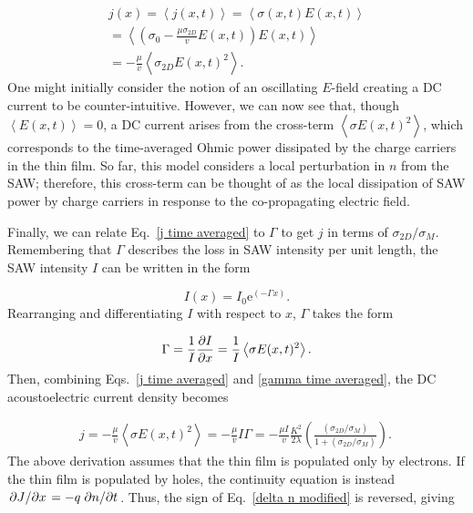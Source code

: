 \documentclass{beavtex_dub_edit}
\begin{document}
\begin{equation}
    \begin{split}
        j(x) = \left\langle j(x,t) \right\rangle = \left\langle \sigma(x,t) E(x,t) \right\rangle \\
        = \left\langle \left( \sigma_0 - \frac{\mu \sigma_{2D}}{v}E(x,t) \right) E(x,t)  \right\rangle \\
        = - \frac{\mu}{v}\left\langle\sigma_{2D} E(x,t)^2\right\rangle. 
    \end{split}
    \label{j time averaged}
\end{equation}
One might initially consider the notion of an oscillating $E$-field creating a DC current to be counter-intuitive. However, we can now see that, though $\left\langle E(x,t) \right\rangle = 0$, a DC current arises from the cross-term $\left\langle \sigma E(x,t) ^2 \right\rangle$, which corresponds to the time-averaged Ohmic power dissipated by the charge carriers in the thin film. So far, this model considers a local perturbation in $n$ from the SAW; therefore, this cross-term can be thought of as the local dissipation of SAW power by charge carriers in response to the co-propagating electric field. 


Finally, we can relate Eq.\ \ref{j time averaged} to $\Gamma$ to get $j$ in terms of $\sigma_{2D}/\sigma_M$. Remembering that $\Gamma$ describes the loss in SAW intensity per unit length, the SAW intensity $I$ can be written in the form

\begin{equation}
    I(x) = I_0 \mathrm{e}^{(-\Gamma x)}.
\end{equation}
Rearranging and differentiating $I$ with respect to $x$, $\Gamma$ takes the form

\begin{equation}
    \Gamma = \frac{1}{I} \pdv{I}{x} = \frac{1}{I}\left\langle\sigma E(x,t)^2\right\rangle. \label{gamma time averaged}
\end{equation}
Then, combining Eqs.\ \ref{j time averaged} and \ref{gamma time averaged}, the DC acoustoelectric current density becomes

\begin{equation}
    \begin{split}
        j = - \frac{\mu}{v}\left\langle\sigma E(x,t)^2\right\rangle = - \frac{\mu}{v} I\Gamma = - \frac{\mu I}{v} \frac{K^2}{2\lambda}(\frac{(\sigma_{2D}/\sigma_M)}{1+(\sigma_{2D}/\sigma_M)}). \
    \end{split}
    \label{DC AEC electron case}
\end{equation}
The above derivation assumes that the thin film is populated only by electrons. If the thin film is populated by holes, the continuity equation is instead $\pdv*{J}{x} = -q \pdv*{n}{t}$. Thus, the sign of Eq.\ \ref{delta n modified} is reversed, giving
\end{document}
